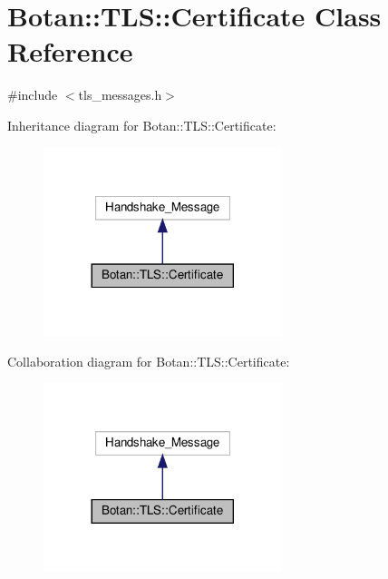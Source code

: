 \hypertarget{class_botan_1_1_t_l_s_1_1_certificate}{}\section{Botan\+:\+:T\+LS\+:\+:Certificate Class Reference}
\label{class_botan_1_1_t_l_s_1_1_certificate}


{\ttfamily \#include $<$tls\+\_\+messages.\+h$>$}



Inheritance diagram for Botan\+:\+:T\+LS\+:\+:Certificate\+:
\nopagebreak
\begin{figure}[H]
\begin{center}
\leavevmode
\includegraphics[width=197pt]{class_botan_1_1_t_l_s_1_1_certificate__inherit__graph}
\end{center}
\end{figure}


Collaboration diagram for Botan\+:\+:T\+LS\+:\+:Certificate\+:
\nopagebreak
\begin{figure}[H]
\begin{center}
\leavevmode
\includegraphics[width=197pt]{class_botan_1_1_t_l_s_1_1_certificate__coll__graph}
\end{center}
\end{figure}

